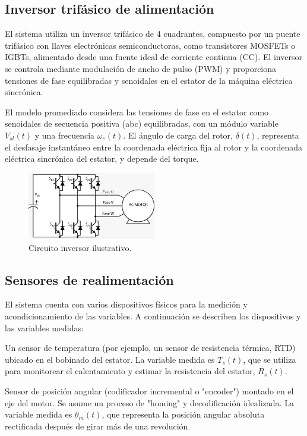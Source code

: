 \documentclass{article}
\begin{document}
\subsection{Inversor trifásico de alimentación}

El sistema utiliza un inversor trifásico de 4 cuadrantes, compuesto por un puente trifásico con llaves 
electrónicas semiconductoras, como transistores MOSFETs o IGBTs, alimentado desde una fuente ideal de 
corriente continua (CC). El inversor se controla mediante modulación de ancho de pulso (PWM) y proporciona 
tensiones de fase equilibradas y senoidales en el estator de la máquina eléctrica sincrónica.

El modelo promediado considera las tensiones de fase en el estator como senoidales de secuencia positiva 
(abc) equilibradas, con un módulo variable $V_{sl}(t)$ y una frecuencia $\omega_e(t)$. El ángulo de carga del rotor, 
$\delta (t)$, representa el desfasaje instantáneo entre la coordenada eléctrica fija al rotor y la coordenada 
eléctrica sincrónica del estator, y depende del torque.

\begin{figure}[H]
    \centering
    \includegraphics[width=0.5\textwidth]{Alan7.jpg}
    \caption{Circuito inversor ilustrativo.}
\end{figure}

\subsection{Sensores de realimentación}

El sistema cuenta con varios dispositivos físicos para la medición y acondicionamiento de las variables. A 
continuación se describen los dispositivos y las variables medidas:

Un sensor de temperatura (por ejemplo, un sensor de resistencia térmica, RTD) ubicado en el bobinado del 
estator. La variable medida es $T_s(t)$, que se utiliza para monitorear el calentamiento y estimar la 
resistencia del estator, $R_s(t)$.

Sensor de posición angular (codificador incremental o "encoder") montado en el eje del motor. Se asume un 
proceso de "homing" y decodificación idealizada. La variable medida es $\theta_m(t)$, que representa la posición 
angular absoluta rectificada después de girar más de una revolución. 
\end{document}
